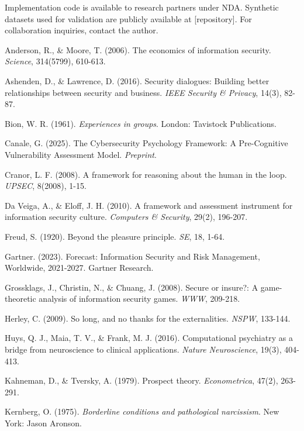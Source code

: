 \documentclass[11pt,a4paper]{article}
\begin{document}
Implementation code is available to research partners under NDA. Synthetic datasets used for validation are publicly available at [repository]. For collaboration inquiries, contact the author.

\begin{thebibliography}{99}

Anderson, R., \& Moore, T. (2006). The economics of information security. \textit{Science}, 314(5799), 610-613.

Ashenden, D., \& Lawrence, D. (2016). Security dialogues: Building better relationships between security and business. \textit{IEEE Security \& Privacy}, 14(3), 82-87.

Bion, W. R. (1961). \textit{Experiences in groups}. London: Tavistock Publications.

Canale, G. (2025). The Cybersecurity Psychology Framework: A Pre-Cognitive Vulnerability Assessment Model. \textit{Preprint}.

Cranor, L. F. (2008). A framework for reasoning about the human in the loop. \textit{UPSEC}, 8(2008), 1-15.

Da Veiga, A., \& Eloff, J. H. (2010). A framework and assessment instrument for information security culture. \textit{Computers \& Security}, 29(2), 196-207.

Freud, S. (1920). Beyond the pleasure principle. \textit{SE}, 18, 1-64.

Gartner. (2023). Forecast: Information Security and Risk Management, Worldwide, 2021-2027. Gartner Research.

Grossklags, J., Christin, N., \& Chuang, J. (2008). Secure or insure?: A game-theoretic analysis of information security games. \textit{WWW}, 209-218.

Herley, C. (2009). So long, and no thanks for the externalities. \textit{NSPW}, 133-144.

Huys, Q. J., Maia, T. V., \& Frank, M. J. (2016). Computational psychiatry as a bridge from neuroscience to clinical applications. \textit{Nature Neuroscience}, 19(3), 404-413.

Kahneman, D., \& Tversky, A. (1979). Prospect theory. \textit{Econometrica}, 47(2), 263-291.

Kernberg, O. (1975). \textit{Borderline conditions and pathological narcissism}. New York: Jason Aronson.


\end{thebibliography}
\end{document}
